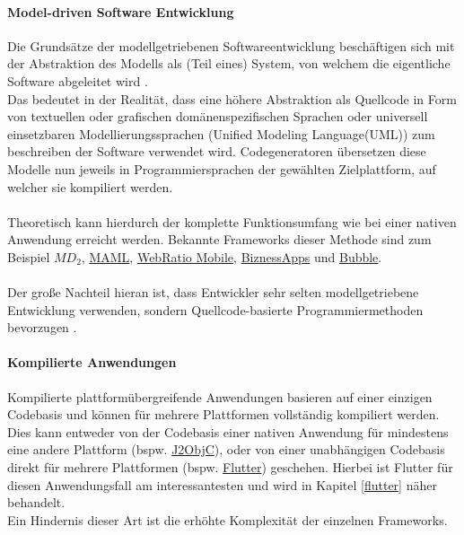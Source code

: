 \paragraph{Model-driven Software Entwicklung}
Die Grundsätze der modellgetriebenen Softwareentwicklung beschäftigen sich mit der Abstraktion des Modells als (Teil eines) System, von welchem die eigentliche Software abgeleitet wird \cite{stahl2006}.\\
Das bedeutet in der Realität, dass eine höhere Abstraktion als Quellcode in Form von textuellen oder grafischen domänenspezifischen Sprachen oder universell einsetzbaren Modellierungssprachen (Unified Modeling Language(UML)) zum beschreiben der Software verwendet wird. 
Codegeneratoren übersetzen diese Modelle nun jeweils in Programmiersprachen der gewählten Zielplattform, auf welcher sie kompiliert werden.\\
\\
Theoretisch kann hierdurch der komplette Funktionsumfang wie bei einer nativen Anwendung erreicht werden.
Bekannte Frameworks dieser Methode sind zum Beispiel \href{https://www.wi.uni-muenster.de/sites/wi/files/public/department/pi/publications/heitkoetter/cross-platform-model-driven-development-of-mobile-applications-with-md2.pdf}{$M\!D_2$}, \href{https://www.sciencedirect.com/science/article/abs/pii/S1477842417301215}{MAML}, \href{https://www.webratio.com/site/content/en/home}{WebRatio Mobile}, \href{https://www.biznessapps.com/}{BiznessApps} und \href{https://bubble.io/}{Bubble}.\\
\\
Der große Nachteil hieran ist, dass Entwickler sehr selten modellgetriebene Entwicklung verwenden, sondern Quellcode-basierte Programmiermethoden bevorzugen \cite{bjorn-hansen2020}.
\paragraph{Kompilierte Anwendungen}
\label{compilierte_anwendungen}
Kompilierte plattformübergreifende Anwendungen basieren auf einer einzigen Codebasis und können für mehrere Plattformen vollständig kompiliert werden. 
Dies kann entweder von der Codebasis einer nativen Anwendung für mindestens eine andere Plattform (bspw. \href{https://developers.google.com/j2objc/}{J2ObjC}), oder von einer unabhängigen Codebasis direkt für mehrere Plattformen (bspw. \href{https://flutter.dev/}{Flutter}) geschehen.
Hierbei ist Flutter für diesen Anwendungsfall am interessantesten und wird in Kapitel \ref{flutter} näher behandelt.\\
Ein Hindernis dieser Art ist die erhöhte Komplexität der einzelnen Frameworks.

